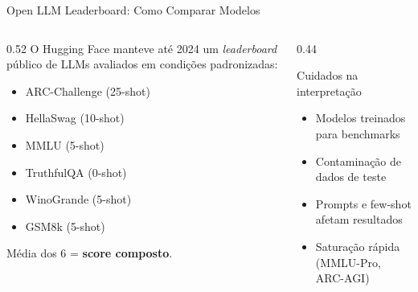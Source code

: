 \documentclass[aspectratio=169, xcolor=dvipsnames]{beamer}
\begin{document}
  \begin{frame}{Open LLM Leaderboard: Como Comparar Modelos}
    \begin{columns}[T]
      \begin{column}{0.52\textwidth}
        O Hugging Face manteve até 2024 um \textit{leaderboard} público de LLMs avaliados em condições padronizadas:
        \begin{itemize}
          \item ARC-Challenge (25-shot)
          \item HellaSwag (10-shot)
          \item MMLU (5-shot)
          \item TruthfulQA (0-shot)
          \item WinoGrande (5-shot)
          \item GSM8k (5-shot)
        \end{itemize}
        Média dos 6 = \textbf{score composto}.
      \end{column}
      \begin{column}{0.44\textwidth}
        \begin{alertblock}{Cuidados na interpretação}
          \begin{itemize}
            \item Modelos treinados para benchmarks
            \item Contaminação de dados de teste
            \item Prompts e few-shot afetam resultados
            \item Saturação rápida (MMLU-Pro, ARC-AGI)
          \end{itemize}
        \end{alertblock}
      \end{column}
    \end{columns}
  \end{frame}
\end{document}
